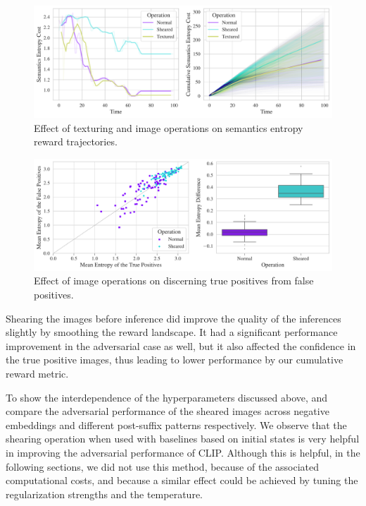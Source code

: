 \begin{figure}[h]
    \centering
    \includegraphics[width=\textwidth]{images/texturing_operations_comparison.pdf}
    \caption{Effect of texturing and image operations on semantics entropy reward trajectories.}
    \label{fig:texturing-operations}
\end{figure}
\vspace{12pt}
\begin{figure}[h]
    \centering
    \includegraphics[width=\textwidth]{images/texturing-operations_adversarial_2.pdf}
    \caption{Effect of image operations on discerning true positives from false positives.}
    \label{fig:texturing-operations-adversarial}
\end{figure}

Shearing the images before inference did improve the quality of the inferences slightly by smoothing the reward landscape.
It had a significant performance improvement in the adversarial case as well, but it also affected the confidence in the true positive images, thus leading to lower performance by our cumulative reward metric.

To show the interdependence of the hyperparameters discussed above,  and   compare the adversarial performance of the sheared images across negative embeddings and different post-suffix patterns respectively.
We observe that the shearing operation when used with baselines based on initial states is very helpful in improving the adversarial performance of CLIP.
Although this is helpful, in the following sections, we did not use this method, because of the associated computational costs, and because a similar effect could be achieved by tuning the regularization strengths and the temperature.

